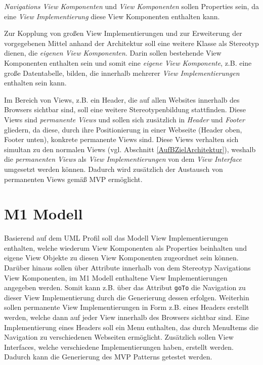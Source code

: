 \textit{Navigations View Komponenten} und \textit{View Komponenten} sollen 
Properties sein, da eine \textit{View Implementierung} diese View Komponenten
enthalten kann.

Zur Kopplung von großen View Implementierungen und zur Erweiterung der
vorgegebenen Mittel anhand der Architektur soll eine weitere Klasse als Stereotyp dienen, die
\textit{eigenen View Komponenten}. Darin sollen bestehende View Komponenten
enthalten sein und somit eine \textit{eigene View Komponente}, z.B. eine große
Datentabelle, bilden, die innerhalb mehrerer \textit{View Implementierungen}
enthalten sein kann.

Im Bereich von Views, z.B. ein Header, die auf allen Websites innerhalb des
Browsers sichtbar sind, soll eine weitere Stereotypenbildung stattfinden. Diese Views
sind \textit{permanente Views} und sollen sich zusätzlich in \textit{Header} und
\textit{Footer} gliedern, da diese, durch
ihre Positionierung in einer Webseite (Header oben, Footer unten), konkrete
permanente Views sind. Diese Views verhalten sich simultan zu den normalen Views (vgl. Abschnitt \ref{AufBZielArchitektur}),
weshalb die \textit{permanenten Views} als \textit{View Implementierungen} von
dem \textit{View Interface} umgesetzt werden können.
Dadurch wird zusätzlich der Austausch von permanenten Views gemäß MVP
ermöglicht.
\section{M1 Modell}\label{AufBM1}
Basierend auf dem UML Profil soll das Modell View Implementierungen enthalten,
welche wiederum View Komponenten als Properties beinhalten und eigene
View Objekte zu diesen View Komponenten zugeordnet sein können. Darüber hinaus
sollen über Attribute innerhalb von dem Stereotyp Navigations View Komponenten,
im M1 Modell enthaltene View Implementierungen angegeben werden. Somit kann z.B.
über das Attribut \texttt{goTo} die Navigation zu dieser View Implementierung
durch die Generierung dessen erfolgen.
Weiterhin sollen permanente View Implementierungen in Form z.B. eines
Headers erstellt werden, welche dann auf jeder View innerhalb des Browsers
sichtbar sind. Eine Implementierung eines Headers soll ein Menu enthalten,
das durch MenuItems die Navigation zu verschiedenen Webseiten ermöglicht.
Zusätzlich sollen View Interfaces, welche verschiedene
Implementierungen haben, erstellt werden. Dadurch kann die Generierung des
MVP Patterns getestet werden.
